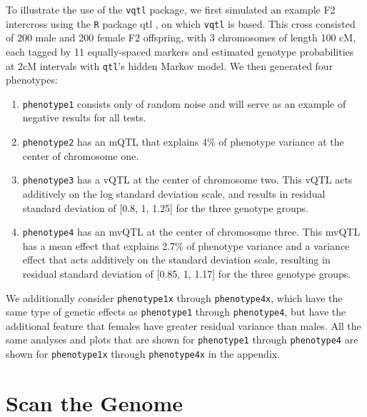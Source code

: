 \documentclass[9pt,twocolumn,twoside]{gsag3jnl}
\begin{document}
To illustrate the use of the \texttt{vqtl} package, we first simulated an example F2 intercross using the \texttt{R} package {qtl} \citep{Broman2003}, on which \texttt{vqtl} is based.
This cross consisted of 200 male and 200 female F2 offspring, with 3 chromosomes of length 100 cM, each tagged by 11 equally-spaced markers and estimated genotype probabilities at 2cM intervals with \texttt{qtl}'s hidden Markov model. We then generated four phenotypes:
\begin{enumerate}
	\item \texttt{phenotype1} consists only of random noise and will serve as an example of negative results for all tests.
	\item \texttt{phenotype2} has an mQTL that explains 4\% of phenotype variance at the center of chromosome one.
	\item \texttt{phenotype3} has a vQTL at the center of chromosome two.
        This vQTL acts additively on the log standard deviation scale, and results in residual standard deviation of [0.8, 1, 1.25] for the three genotype groups.
	\item \texttt{phenotype4} has an mvQTL at the center of chromosome three.
        This mvQTL has a mean effect that explains 2.7\% of phenotype variance and a variance effect that acts additively on the standard deviation scale, resulting in residual standard deviation of [0.85, 1, 1.17] for the three genotype groups.
\end{enumerate}

We additionally consider \texttt{phenotype1x} through \texttt{phenotype4x}, which have the same type of genetic effects as \texttt{phenotype1} through \texttt{phenotype4}, but have the additional feature that females have greater residual variance than males.
All the same analyses and plots that are shown for \texttt{phenotype1} through \texttt{phenotype4} are shown for \texttt{phenotype1x} through \texttt{phenotype4x} in the appendix.

\section*{Scan the Genome}
\end{document}
